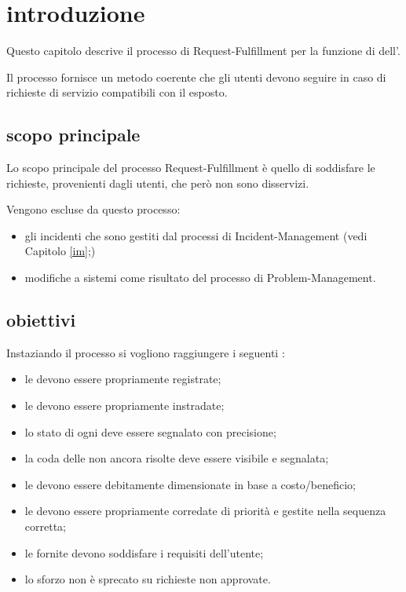 %
%
\section[Introduzione]{introduzione}
\label{im-introduction}
Questo capitolo descrive il processo di \acf{Request-Fulfillment} per la funzione di  dell'\entity{}.

Il processo fornisce un metodo coerente che gli utenti devono seguire in caso di richieste di servizio compatibili con il  esposto.

\subsection[Scopo principale]{scopo principale}
\label{im-introduction-scope}
Lo scopo principale del processo \acf{Request-Fulfillment} è quello di soddisfare le richieste, provenienti dagli utenti, che però non sono disservizi.

Vengono escluse da questo processo:

\begin{itemize}
\item{gli incidenti che sono gestiti dal processi di \ac{Incident-Management} (vedi Capitolo \ref{im};)}
\item{modifiche a sistemi come risultato del processo di \ac{Problem-Management}.}
\end{itemize}

\subsection[Obiettivi]{obiettivi}
\label{im-introduction-objectives}
Instaziando il processo si vogliono raggiungere i seguenti :

\begin{itemize}
\item{le  devono essere propriamente registrate;}
\item{le  devono essere propriamente instradate;}
\item{lo stato di ogni  deve essere segnalato con precisione;}
\item{la coda delle  non ancora risolte deve essere visibile e segnalata;}
\item{le  devono essere debitamente dimensionate in base a costo/beneficio;}
\item{le  devono essere propriamente corredate di priorità e gestite nella sequenza corretta;}
\item{le  fornite devono soddisfare i requisiti dell'utente;}
\item{lo sforzo non è sprecato su richieste non approvate.}
\end{itemize}

